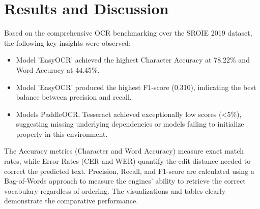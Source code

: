 \section*{Results and Discussion}

Based on the comprehensive OCR benchmarking over the SROIE 2019 dataset, the following key insights were observed:

\begin{itemize}
    \item Model 'EasyOCR' achieved the highest Character Accuracy at 78.22\% and Word Accuracy at 44.45\%.
    \item Model 'EasyOCR' produced the highest F1-score (0.310), indicating the best balance between precision and recall.
    \item Models PaddleOCR, Tesseract achieved exceptionally low scores (<5\%), suggesting missing underlying dependencies or models failing to initialize properly in this environment.
\end{itemize}

The Accuracy metrics (Character and Word Accuracy) measure exact match rates, while Error Rates (CER and WER) quantify the edit distance needed to correct the predicted text. Precision, Recall, and F1-score are calculated using a Bag-of-Words approach to measure the engines' ability to retrieve the correct vocabulary regardless of ordering. The visualizations and tables clearly demonstrate the comparative performance.
